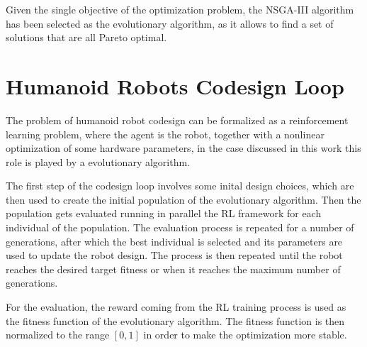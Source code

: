 Given the single objective of the optimization problem, the \ac{NSGA}-III algorithm has been selected as the evolutionary algorithm, as it allows to find a set of solutions that are all Pareto optimal.


\section{Humanoid Robots Codesign Loop}
\label{sec:Codesign}

The problem of humanoid robot codesign can be formalized as a reinforcement learning problem, where the agent is the robot, together with a nonlinear optimization of some hardware parameters, in the case discussed in this work this role is played by a evolutionary algorithm.

The first step of the codesign loop involves some inital design choices, which are then used to create the initial population of the evolutionary algorithm. Then the population gets evaluated running in parallel the \ac{RL} framework for each individual of the population. The evaluation process is repeated for a number of generations, after which the best individual is selected and its parameters are used to update the robot design. The process is then repeated until the robot reaches the desired target fitness or when it reaches the maximum number of generations.

For the evaluation, the reward coming from the \ac{RL} training process is used as the fitness function of the evolutionary algorithm. The fitness function is then normalized to the range $[0,1]$ in order to make the optimization more stable.
